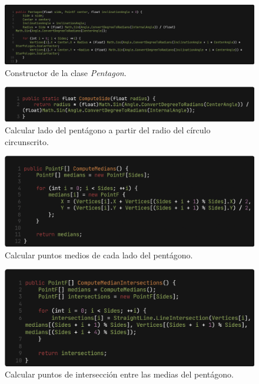 \documentclass[oneside, a4paper]{article}
\begin{document}
            \begin{figure}[H]
                \centering
                \includegraphics[width=\textwidth]{pentagon_constructor.png}
                \caption{Constructor de la clase \textit{Pentagon}.}
                \label{fig:pentagon_constructor}
            \end{figure}
            
            \begin{figure}[H]
                \centering
                \includegraphics[width=\textwidth]{compute_side.png}
                \caption{Calcular lado del pentágono a partir del radio del círculo circunscrito.}
                \label{fig:compute_side}
            \end{figure}

            \begin{figure}[H]
                \centering
                \includegraphics[width=\textwidth]{compute_medians.png}
                \caption{Calcular puntos medios de cada lado del pentágono.}
                \label{fig:compute_medians}
            \end{figure}

            \begin{figure}[H]
                \centering
                \includegraphics[width=\textwidth]{compute_median_intersections.png}
                \caption{Calcular puntos de intersección entre las medias del pentágono.}
                \label{fig:compute_median_intersections}
            \end{figure}
\end{document}
